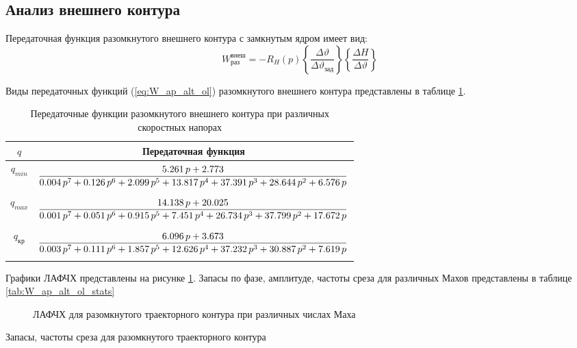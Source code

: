 \subsection{Анализ внешнего контура}
Передаточная функция разомкнутого внешнего контура с замкнутым ядром имеет вид:
\begin{equation}
    W_{раз}^{внеш} = -R_H(p) \left\{ \frac{\Delta \vartheta}{\Delta \vartheta_{зад}} \right\} \left\{ \frac{\Delta H }{\Delta \vartheta} \right\} 
    \label{eq:W_ap_alt_ol}
\end{equation}

Виды передаточных функций (\ref{eq:W_ap_alt_ol}) разомкнутого внешнего контура представлены в таблице \ref{tab:W_ap_alt_ol}.

\begin{table}[H]
    \centering
    \caption{Передаточные функции разомкнутого внешнего контура при различных скоростных напорах}
    \label{tab:W_ap_alt_ol}
    \begin{tabular}{|c|c|}
        \hline
    $q$ & Передаточная функция\\ 
    \hline
    $q_{min}$& $\displaystyle \frac{5.261\,p+2.773}{0.004\,p^7+0.126\,p^6+2.099\,p^5+13.817\,p^4+37.391\,p^3+28.644\,p^2+6.576\,p}\addstrut{3em}$\\ 
    \hline
    $q_{max}$& $\displaystyle \frac{14.138\,p+20.025}{0.001\,p^7+0.051\,p^6+0.915\,p^5+7.451\,p^4+26.734\,p^3+37.799\,p^2+17.672\,p}\addstrut{3em}$\\
    \hline
    $q_{кр}$& $\displaystyle \frac{6.096\,p+3.673}{0.003\,p^7+0.111\,p^6+1.857\,p^5+12.626\,p^4+37.232\,p^3+30.887\,p^2+7.619\,p}\addstrut{3em}$ \\
    \hline
    \end{tabular}
\end{table}

Графики ЛАФЧХ представлены на рисунке \ref{fig:W_ap_alt_ol}. Запасы по фазе,
амплитуде, частоты среза для различных Махов представлены в таблице
\ref{tab:W_ap_alt_ol_stats}

\begin{figure}[H]
    \centering
    
    \caption{ЛАФЧХ для разомкнутого траекторного контура при различных числах Маха}
    \label{fig:W_ap_alt_ol}
\end{figure}

\begin{table}[H]
    \centering
    \caption{Запасы, частоты среза для разомкнутого траекторного контура}
    \label{tab:W_ap_alt_ol_stats}
    
\end{table}

